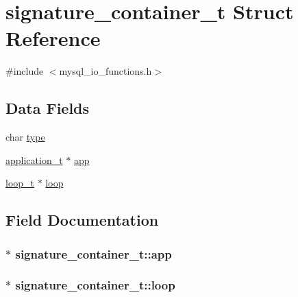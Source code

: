 \hypertarget{structsignature__container__t}{}\section{signature\+\_\+container\+\_\+t Struct Reference}
\label{structsignature__container__t}


{\ttfamily \#include $<$mysql\+\_\+io\+\_\+functions.\+h$>$}

\subsection*{Data Fields}
\begin{DoxyCompactItemize}
\item 
char \hyperlink{structsignature__container__t_a3b1d67e93302ecd687db847f2bdfca16}{type}
\item 
\hyperlink{application_8h_af0a524c43fc5f548021099181df194bf}{application\+\_\+t} $\ast$ \hyperlink{structsignature__container__t_a0e096cbc5c3f7d0e05d140c2148743d2}{app}
\item 
\hyperlink{loop_8h_a3cab4c06c8bb84fe949df61aa5ca8d5b}{loop\+\_\+t} $\ast$ \hyperlink{structsignature__container__t_a1bdf5b33d011bbf45a4b3f12dc4565cf}{loop}
\end{DoxyCompactItemize}


\subsection{Field Documentation}
\subsubsection[{\texorpdfstring{app}{app}}]{$\ast$ signature\+\_\+container\+\_\+t\+::app}\hypertarget{structsignature__container__t_a0e096cbc5c3f7d0e05d140c2148743d2}{}\label{structsignature__container__t_a0e096cbc5c3f7d0e05d140c2148743d2}
\subsubsection[{\texorpdfstring{loop}{loop}}]{$\ast$ signature\+\_\+container\+\_\+t\+::loop}\hypertarget{structsignature__container__t_a1bdf5b33d011bbf45a4b3f12dc4565cf}{}\label{structsignature__container__t_a1bdf5b33d011bbf45a4b3f12dc4565cf}
